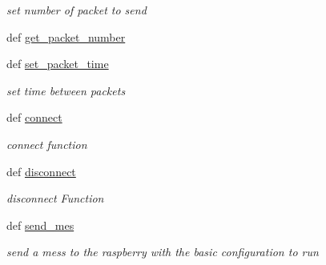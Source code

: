 \begin{DoxyCompactItemize}
\begin{DoxyCompactList}\small\item\em set number of packet to send \end{DoxyCompactList}\item 
def \hyperlink{classConfigurationServer_1_1ConfigurationServer_adedebc42f319c193885f5fca2d597a3c}{get\+\_\+packet\+\_\+number}
\item 
def \hyperlink{classConfigurationServer_1_1ConfigurationServer_a1bca01183fff08ed4b5ecb6aa4ea625f}{set\+\_\+packet\+\_\+time}
\begin{DoxyCompactList}\small\item\em set time between packets \end{DoxyCompactList}\item 
def \hyperlink{classConfigurationServer_1_1ConfigurationServer_a23423c753aad5cd30be8d33bcf659a39}{connect}
\begin{DoxyCompactList}\small\item\em connect function \end{DoxyCompactList}\item 
\hypertarget{classConfigurationServer_1_1ConfigurationServer_a8ab0622b99df3c11d191e307ba3dc691}{def \hyperlink{classConfigurationServer_1_1ConfigurationServer_a8ab0622b99df3c11d191e307ba3dc691}{disconnect}}\label{classConfigurationServer_1_1ConfigurationServer_a8ab0622b99df3c11d191e307ba3dc691}

\begin{DoxyCompactList}\small\item\em disconnect Function \end{DoxyCompactList}\item 
\hypertarget{classConfigurationServer_1_1ConfigurationServer_a48d41bf2f52a156385414f9590a40f4a}{def \hyperlink{classConfigurationServer_1_1ConfigurationServer_a48d41bf2f52a156385414f9590a40f4a}{send\+\_\+mes}}\label{classConfigurationServer_1_1ConfigurationServer_a48d41bf2f52a156385414f9590a40f4a}

\begin{DoxyCompactList}\small\item\em send a mess to the raspberry with the basic configuration to run \end{DoxyCompactList}\end{DoxyCompactItemize}
